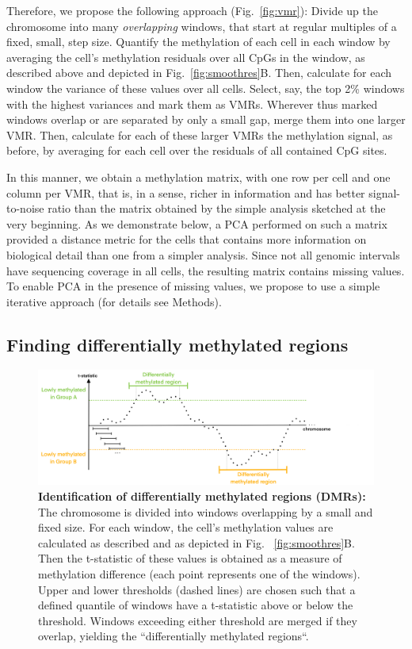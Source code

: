 \documentclass[twocolumn,10pt]{article}
\begin{document}
Therefore, we propose the following approach (Fig.~\ref{fig:vmr}): Divide up the chromosome into many \emph{overlapping} windows, that start at regular multiples of a fixed, small, step size.
Quantify the methylation of each cell in each window by averaging the cell's methylation residuals over all CpGs in the window, as described above and depicted in Fig.~\ref{fig:smoothres}B.
Then, calculate for each window the variance of these values over all cells.
Select, say, the top 2\% windows with the highest variances and mark them as VMRs.
Wherever thus marked windows overlap or are separated by only a small gap, merge them into one larger VMR.
Then, calculate for each of these larger VMRs the methylation signal, as before, by averaging for each cell over the residuals of all contained CpG sites.

In this manner, we obtain a methylation matrix, with one row per cell and one column per VMR, that is, in a sense, richer in information and has better signal-to-noise ratio than the matrix obtained by the simple analysis sketched at the very beginning.
As we demonstrate below, a PCA performed on such a matrix provided a distance metric for the cells that contains more information on biological detail than one from a simpler analysis.
Since not all genomic intervals have sequencing coverage in all cells, the resulting matrix contains missing values.
To enable PCA in the presence of missing values, we propose to use a simple iterative approach (for details see Methods).

\subsection{Finding differentially methylated regions}

\begin{figure}
    \includegraphics[width=\columnwidth]{figures/Fig_DMRdetection.png}
    \caption{\small \textbf{Identification of differentially methylated regions (DMRs):}
    The chromosome is divided into windows overlapping by a small and fixed size.
    For each window, the cell’s methylation values are calculated as described and as depicted in Fig.~ \ref{fig:smoothres}B.
    Then the t-statistic of these values is obtained as a measure of methylation difference (each point represents one of the windows).
    Upper and lower thresholds (dashed lines) are chosen such that a defined quantile of windows have a t-statistic above or below the threshold.
    Windows exceeding either threshold are merged if they overlap, yielding the ``differentially methylated regions``.}
    \label{fig:dmrscan}
\end{figure}
\end{document}
